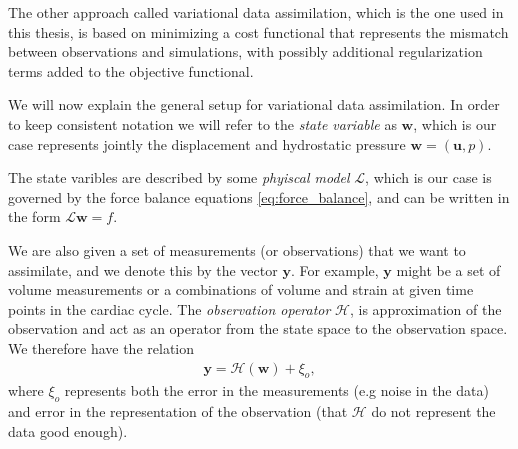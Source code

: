 The other approach called variational data assimilation, which is the
one used in this thesis, is based on minimizing a cost functional that
represents the mismatch between observations and simulations, with
possibly additional regularization terms added to the objective
functional. 

We will now explain the general setup for variational data
assimilation. In order to keep consistent notation we will refer to
the \emph{state variable} as $\mathbf{w}$, which is our case
represents jointly the displacement and hydrostatic pressure
$\mathbf{w}=(\mathbf{u}, p)$.

The state varibles are described by some \emph{phyiscal
model} $\mathcal{L}$, which is our case is governed by the force balance
equations \eqref{eq:force_balance}, and can be written in the form
$\mathcal{L}\mathbf{w} = f$.

We are also given a set of measurements (or observations) that we want
to assimilate, and we denote this by the vector $\mathbf{y}$.
For example, $\mathbf{y}$ might be a set of volume measurements or a
combinations of volume and strain at given time points in the cardiac
cycle. The \emph{observation operator} $\mathcal{H}$, is approximation
of the observation and act as an operator from the state space to the
observation space. We therefore have the relation
\begin{align}
  \mathbf{y} = \mathcal{H}(\mathbf{w}) + \xi_o, 
\end{align}
where $\xi_o$ represents both the error in the measurements (e.g
noise in the data) and error in the representation of the observation
(that $\mathcal{H}$ do not represent the data good enough).


